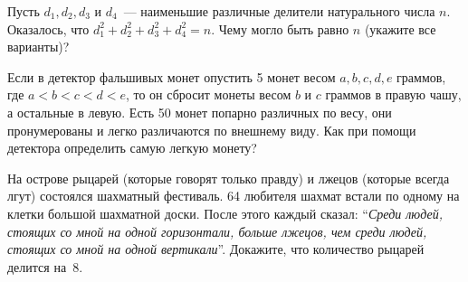 \begin{problems}
\item Пусть $d_1, d_2 , d_3$ и $d_4$~--- наименьшие различные делители натурального числа $n$. Оказалось, что $d_1^2+d_2^2+d_3^2+d_4^2=n$. Чему могло быть равно $n$ (укажите все варианты)?

\item Если в детектор фальшивых монет опустить 5 монет весом $a, b, c, d, e$ граммов, где $a<b<c<d<e$, то он сбросит монеты весом $b$ и $c$ граммов в правую чашу, а остальные в левую. Есть 50 монет попарно различных по весу, они пронумерованы и легко различаются по внешнему виду. Как при помощи детектора определить самую легкую монету?

\item На острове рыцарей (которые говорят только правду) и лжецов (которые всегда
лгут) состоялся шахматный фестиваль. 64 любителя шахмат встали по
одному на клетки большой шахматной доски. После этого каждый сказал:
``{\it Среди людей, стоящих со мной на одной горизонтали, больше лжецов, чем
среди людей, стоящих со мной на одной вертикали}''. Докажите, что
количество рыцарей делится на~8.

\end{problems}

